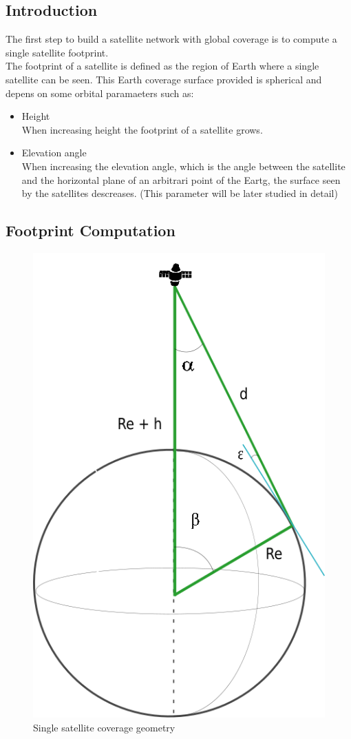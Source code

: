 

\subsection{Introduction}

The first step to build a satellite network with global coverage is to compute a single satellite footprint.\\

The footprint of a satellite is defined as the region of Earth where a single satellite can be seen. This Earth coverage surface provided is spherical and depens on some orbital paramaeters such as:

\begin{itemize}
\item Height \\
When increasing height the footprint of a satellite grows.
\item Elevation angle \\
When increasing the elevation angle, which is the angle between the satellite and the horizontal plane of an arbitrari point of the Eartg, the surface seen by the satellites descreases. (This parameter will be later studied in detail)
\end{itemize}

\subsection{Footprint Computation}
 
\begin{figure} %

	\centering
	\includegraphics[width=.3\textwidth]{./fig-Ch2-OrbitalCoverage/AngleSSatFoot.png}
	\caption{Single satellite coverage geometry}
	\label{fig:AngleSSatFoot}
	
\end{figure}

